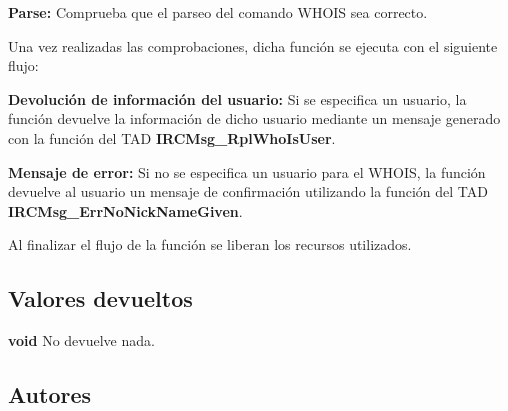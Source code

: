 \begin{DoxyItemize}
\item {\bfseries Parse\+:} Comprueba que el parseo del comando W\+H\+O\+IS sea correcto. 
\end{DoxyItemize}

Una vez realizadas las comprobaciones, dicha función se ejecuta con el siguiente flujo\+:


\begin{DoxyItemize}
\item {\bfseries Devolución de información del usuario\+:} Si se especifica un usuario, la función devuelve la información de dicho usuario mediante un mensaje generado con la función del T\+AD {\bfseries I\+R\+C\+Msg\+\_\+\+Rpl\+Who\+Is\+User}.  
\item {\bfseries Mensaje de error\+:} Si no se especifica un usuario para el W\+H\+O\+IS, la función devuelve al usuario un mensaje de confirmación utilizando la función del T\+AD {\bfseries I\+R\+C\+Msg\+\_\+\+Err\+No\+Nick\+Name\+Given}.  
\end{DoxyItemize}

Al finalizar el flujo de la función se liberan los recursos utilizados.\hypertarget{server_command_whois_return_whois}{}\subsection{Valores devueltos}\label{server_command_whois_return_whois}

\begin{DoxyItemize}
\item {\bfseries void} No devuelve nada. 
\end{DoxyItemize}\hypertarget{server_command_whois_authors_whois}{}\subsection{Autores}\label{server_command_whois_authors_whois}

